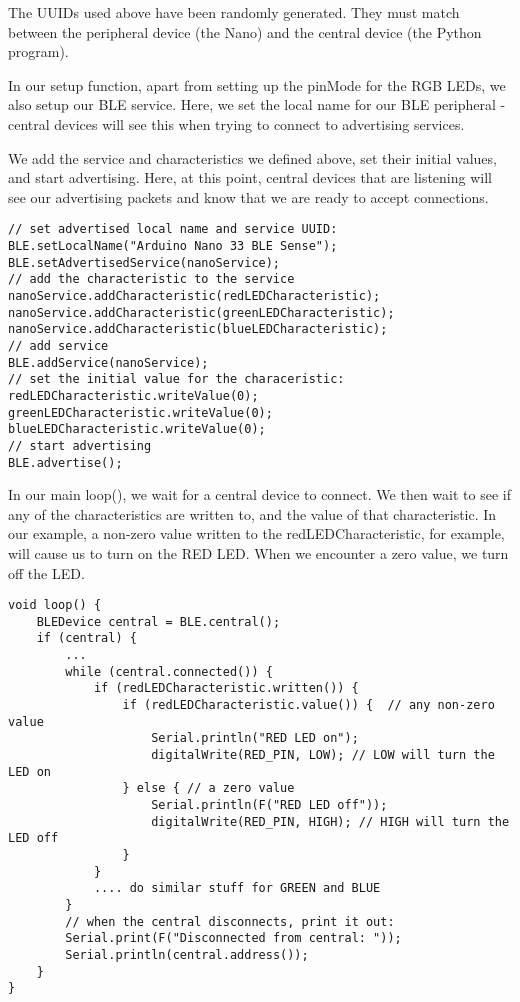 The UUIDs used above have been randomly generated. They must match between the peripheral device (the Nano) and the central device (the Python program).

In our setup function, apart from setting up the pinMode for the RGB LEDs, we also setup our BLE service. Here, we set the local name for our BLE peripheral - central devices will see this when trying to connect to advertising services.

We add the service and characteristics we defined above, set their initial values, and start advertising. Here, at this point, central devices that are listening will see our advertising packets and know that we are ready to accept connections.


\begin{lstlisting}
// set advertised local name and service UUID:
BLE.setLocalName("Arduino Nano 33 BLE Sense");
BLE.setAdvertisedService(nanoService);
// add the characteristic to the service
nanoService.addCharacteristic(redLEDCharacteristic);
nanoService.addCharacteristic(greenLEDCharacteristic);
nanoService.addCharacteristic(blueLEDCharacteristic);
// add service
BLE.addService(nanoService);
// set the initial value for the characeristic:
redLEDCharacteristic.writeValue(0);
greenLEDCharacteristic.writeValue(0);
blueLEDCharacteristic.writeValue(0);
// start advertising
BLE.advertise();
\end{lstlisting}

In our main loop(), we wait for a central device to connect. We then wait to see if any of the characteristics are written to, and the value of that characteristic. In our example, a non-zero value written to the redLEDCharacteristic, for example, will cause us to turn on the RED LED. When we encounter a zero value, we turn off the LED.

\begin{lstlisting}
void loop() {
	BLEDevice central = BLE.central();
	if (central) {
		...
		while (central.connected()) {
			if (redLEDCharacteristic.written()) {
				if (redLEDCharacteristic.value()) {  // any non-zero value
					Serial.println("RED LED on");
					digitalWrite(RED_PIN, LOW); // LOW will turn the LED on
				} else { // a zero value
					Serial.println(F("RED LED off"));
					digitalWrite(RED_PIN, HIGH); // HIGH will turn the LED off
				}
			} 
			.... do similar stuff for GREEN and BLUE
		}
		// when the central disconnects, print it out:
		Serial.print(F("Disconnected from central: "));
		Serial.println(central.address());
	}
}
\end{lstlisting}

